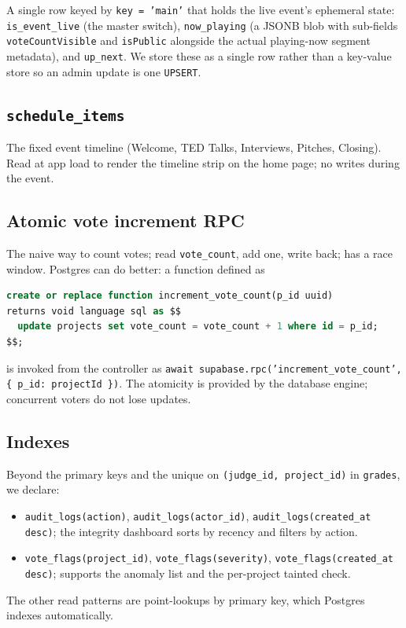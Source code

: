 A single row keyed by \texttt{key = 'main'} that holds the live event's
ephemeral state: \texttt{is\_event\_live} (the master switch),
\texttt{now\_playing} (a JSONB blob with sub-fields
\texttt{voteCountVisible} and \texttt{isPublic} alongside the actual
playing-now segment metadata), and \texttt{up\_next}. We store these as a
single row rather than a key-value store so an admin update is one
\texttt{UPSERT}.

\subsection{\texttt{schedule\_items}}

The fixed event timeline (Welcome, TED Talks, Interviews, Pitches,
Closing). Read at app load to render the timeline strip on the home page;
no writes during the event.

\subsection{Atomic vote increment RPC}
\label{sub:rpc}

The naive way to count votes; read \texttt{vote\_count}, add one,
write back; has a race window. Postgres can do better: a function
defined as

\begin{lstlisting}[language=SQL]
create or replace function increment_vote_count(p_id uuid)
returns void language sql as $$
  update projects set vote_count = vote_count + 1 where id = p_id;
$$;
\end{lstlisting}

is invoked from the controller as
\texttt{await supabase.rpc('increment\_vote\_count', \{ p\_id: projectId \})}.
The atomicity is provided by the database engine; concurrent voters do
not lose updates.

\subsection{Indexes}

Beyond the primary keys and the unique on \texttt{(judge\_id,
project\_id)} in \texttt{grades}, we declare:

\begin{itemize}[leftmargin=*]
  \item \texttt{audit\_logs(action)}, \texttt{audit\_logs(actor\_id)},
        \texttt{audit\_logs(created\_at desc)}; the integrity dashboard
        sorts by recency and filters by action.
  \item \texttt{vote\_flags(project\_id)},
        \texttt{vote\_flags(severity)},
        \texttt{vote\_flags(created\_at desc)}; supports the anomaly
        list and the per-project tainted check.
\end{itemize}

The other read patterns are point-lookups by primary key, which Postgres
indexes automatically.

